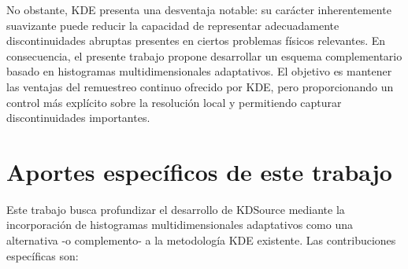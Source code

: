No obstante, KDE presenta una desventaja notable: su carácter inherentemente suavizante puede reducir la capacidad de representar adecuadamente discontinuidades abruptas presentes en ciertos problemas físicos relevantes. En consecuencia, el presente trabajo propone desarrollar un esquema complementario basado en histogramas multidimensionales adaptativos. El objetivo es mantener las ventajas del remuestreo continuo ofrecido por KDE, pero proporcionando un control más explícito sobre la resolución local y permitiendo capturar discontinuidades importantes.

\section{Aportes específicos de este trabajo}

Este trabajo busca profundizar el desarrollo de KDSource mediante la incorporación de histogramas multidimensionales adaptativos como una alternativa -o complemento- a la metodología KDE existente. Las contribuciones específicas son:

